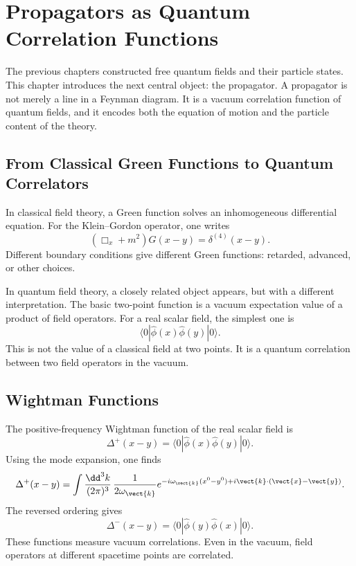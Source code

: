 \chapter{Propagators as Quantum Correlation Functions}

\begin{remarkbox}
The previous chapters constructed free quantum fields and their particle states.
This chapter introduces the next central object: the propagator. A propagator is
not merely a line in a Feynman diagram. It is a vacuum correlation function of
quantum fields, and it encodes both the equation of motion and the particle
content of the theory.
\end{remarkbox}

\section{From Classical Green Functions to Quantum Correlators}

In classical field theory, a Green function solves an inhomogeneous differential
equation. For the Klein--Gordon operator, one writes
\[
    (\Box_x+m^2)G(x-y)=\delta^{(4)}(x-y).
\]
Different boundary conditions give different Green functions: retarded,
advanced, or other choices.

In quantum field theory, a closely related object appears, but with a different
interpretation. The basic two-point function is a vacuum expectation value of a
product of field operators. For a real scalar field, the simplest one is
\[
    \langle0|\hat\phi(x)\hat\phi(y)|0\rangle.
\]
This is not the value of a classical field at two points. It is a quantum
correlation between two field operators in the vacuum.

\section{Wightman Functions}

The positive-frequency Wightman function of the real scalar field is
\[
    \Delta^+(x-y)
    = \langle0|\hat\phi(x)\hat\phi(y)|0\rangle.
\]
Using the mode expansion, one finds
\[
    \Delta^+(x-y)
    = \int\frac{\dd^3k}{(2\pi)^3}\,
      \frac{1}{2\omega_{\vect{k}}}
      e^{-i\omega_{\vect{k}}(x^0-y^0)+i\vect{k}\cdot(\vect{x}-\vect{y})}.
\]
The reversed ordering gives
\[
    \Delta^-(x-y)
    = \langle0|\hat\phi(y)\hat\phi(x)|0\rangle.
\]
These functions measure vacuum correlations. Even in the vacuum, field
operators at different spacetime points are correlated.


